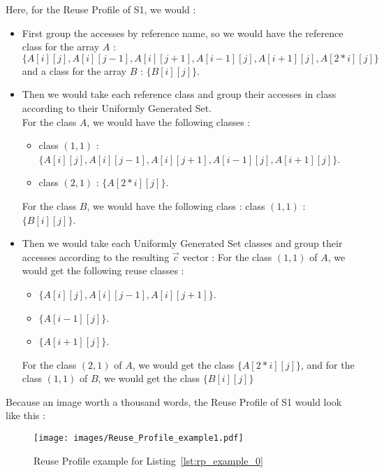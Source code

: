 \documentclass[paper=a4, fontsize=11.5pt]{scrartcl}
\numberwithin{equation}{section}        %
\numberwithin{figure}{section}          %
\numberwithin{table}{section}               %
\begin{document}
        Here, for the Reuse Profile of S1, we would :
        \begin{itemize}
            \item[] First group the accesses by reference name, so we would have the reference
                class for the array $A$ : $\{A[i][j],A[i][j-1],A[i][j+1],A[i-1][j],A[i+1][j],A[2*i][j]\}$
                and a class for the array $B$ : $\{B[i][j]\}$.
            \item[] Then we would take each reference class and group their accesses in class
                according to their Uniformly Generated Set.\\
                For the class $A$, we would have the following classes :
                    \begin{itemize}
                        \item class $(1,1)$ : $\{A[i][j],A[i][j-1],A[i][j+1],A[i-1][j],A[i+1][j]\}$.
                        \item class $(2,1)$ : $\{A[2*i][j]\}$.
                    \end{itemize}
                For the class $B$, we would have the following class : class $(1,1)$ : $\{B[i][j]\}$.
            \item[] Then we would take each Uniformly Generated Set classes and group their
                accesses according to the resulting $\vec{c}$ vector :
                For the class $(1,1)$ of $A$, we would get the following reuse classes :
                \begin{itemize}
                    \item $\{A[i][j],A[i][j-1],A[i][j+1]\}$.
                    \item $\{A[i-1][j]\}$.
                    \item $\{A[i+1][j]\}$.
                \end{itemize}
                For the class $(2,1)$ of $A$, we would get the class $\{A[2*i][j]\}$, and
                for the class $(1,1)$ of $B$, we would get the class $\{B[i][j]\}$
        \end{itemize}
        
        Because an image worth a thousand words, the Reuse Profile of S1 would look like this :
        \begin{figure}[H]
            \caption{Reuse Profile example for Listing~\ref{lst:rp_example_0}}
            \centering
            \texttt{[image: images/Reuse\_Profile\_example1.pdf]}
        \end{figure}
\end{document}
